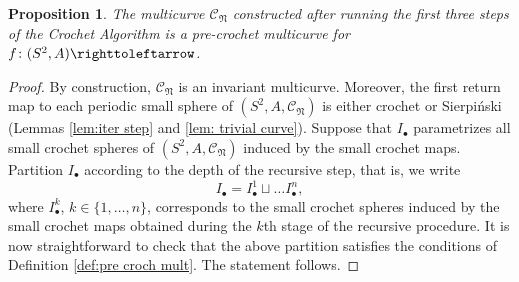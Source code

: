 \documentclass{amsart}
\theoremstyle{plain}
\newtheorem{lemma}[theorem]{Lemma}
\newtheorem{proposition}[theorem]{Proposition}
\theoremstyle{definition}
\theoremstyle{remark}
\newcommand{\CC}{{\mathcal C}}
\newcommand{\NL}{{\mathfrak N}}
\newcommand\selfmap{\righttoleftarrow}
\begin{document}




\begin{proposition}\label{prop: pre-crochet-algo}
The multicurve $\CC_\NL$ constructed after running the first three steps of the Crochet Algorithm is a pre-crochet multicurve for $f\colon (S^2,A)\selfmap$.
\end{proposition}

\begin{proof}
By construction, $\CC_\NL$ is an invariant multicurve. Moreover, the first return map to each periodic small sphere of $(S^2,A, \CC_\NL)$ is either crochet or Sierpi\'{n}ski (Lemmas \ref{lem:iter step} and \ref{lem: trivial curve}). Suppose that $I_\bullet$ parametrizes all small crochet spheres of $(S^2, A, \CC_\NL)$ induced by the small crochet maps. Partition $I_\bullet$ according to the depth of the recursive step, that is, we write 
\[I_\bullet = I^1_\bullet \sqcup \dots I^n_\bullet,\]
where $I^k_\bullet$, $k\in\{1,\dots,n\}$, corresponds to the small crochet spheres induced by the small crochet maps obtained during the $k$th stage of the recursive procedure. It is now straightforward to check that the above partition satisfies the conditions of Definition \ref{def:pre croch mult}. The statement follows. 
\end{proof}
\end{document}
